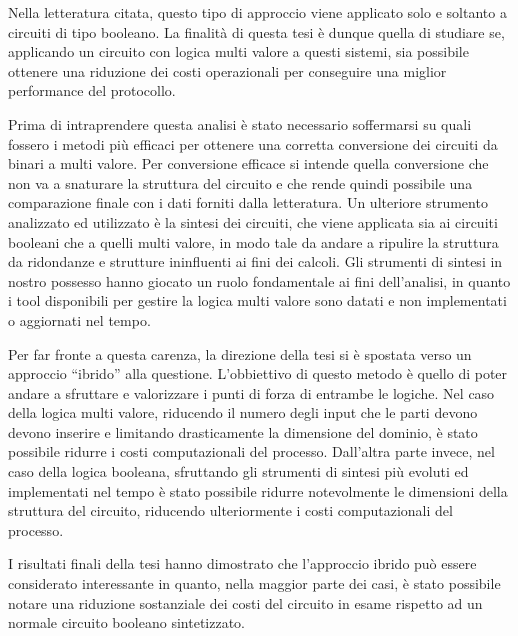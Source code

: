 \documentclass[
]{book}
\begin{document}
Nella letteratura citata, questo tipo di approccio viene applicato solo e soltanto a circuiti di tipo booleano. La finalità di questa tesi è dunque quella di studiare se, applicando un circuito con logica multi valore a questi sistemi, sia possibile ottenere una riduzione dei costi operazionali per conseguire una miglior performance del protocollo.

Prima di intraprendere questa analisi è stato necessario soffermarsi su quali fossero i metodi più efficaci per ottenere una corretta conversione dei circuiti da binari a multi valore. Per conversione efficace si intende quella conversione che non va a snaturare la struttura del circuito e che rende quindi possibile una comparazione finale con i dati forniti dalla letteratura. Un ulteriore strumento analizzato ed utilizzato è la sintesi dei circuiti, che viene applicata sia ai circuiti booleani che a quelli multi valore, in modo tale da andare a ripulire la struttura da ridondanze e strutture ininfluenti ai fini dei calcoli. Gli strumenti di sintesi in nostro possesso hanno giocato un ruolo fondamentale ai fini dell'analisi, in quanto i tool disponibili per gestire la logica multi valore sono datati e non implementati o aggiornati nel tempo.

Per far fronte a questa carenza, la direzione della tesi si è spostata verso un approccio ``ibrido'' alla questione. L'obbiettivo di questo metodo è quello di poter andare a sfruttare e valorizzare i punti di forza di entrambe le logiche. Nel caso della logica multi valore, riducendo il numero degli input che le parti devono devono inserire e limitando drasticamente la dimensione del dominio, è stato possibile ridurre i costi computazionali del processo. Dall'altra parte invece, nel caso della logica booleana, sfruttando gli strumenti di sintesi più evoluti ed implementati nel tempo è stato possibile ridurre notevolmente le dimensioni della struttura del circuito, riducendo ulteriormente i costi computazionali del processo.

I risultati finali della tesi hanno dimostrato che l'approccio ibrido può essere considerato interessante in quanto, nella maggior parte dei casi, è stato possibile notare una riduzione sostanziale dei costi del circuito in esame rispetto ad un normale circuito booleano sintetizzato.

\newpage
\end{document}
